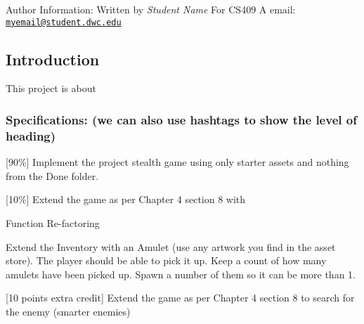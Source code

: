 Author Information\+: Written by {\itshape Student Name} For C\+S409 A email\+: \href{mailto:myemail@student.dwc.edu}{\tt myemail@student.\+dwc.\+edu}

\subsection*{Introduction }

This project is about

\subsubsection*{Specifications\+: (we can also use hashtags to show the level of heading)}


\begin{DoxyItemize}
\item \mbox{[}90\%\mbox{]} Implement the project stealth game using only starter assets and nothing from the Done folder.
\item \mbox{[}10\%\mbox{]} Extend the game as per Chapter 4 section 8 with
\begin{DoxyEnumerate}
\item Function Re-\/factoring
\item Extend the Inventory with an Amulet (use any artwork you find in the asset store). The player should be able to pick it up. Keep a count of how many amulets have been picked up. Spawn a number of them so it can be more than 1.
\end{DoxyEnumerate}
\item \mbox{[}10 points extra credit\mbox{]} Extend the game as per Chapter 4 section 8 to search for the enemy (smarter enemies) 
\end{DoxyItemize}